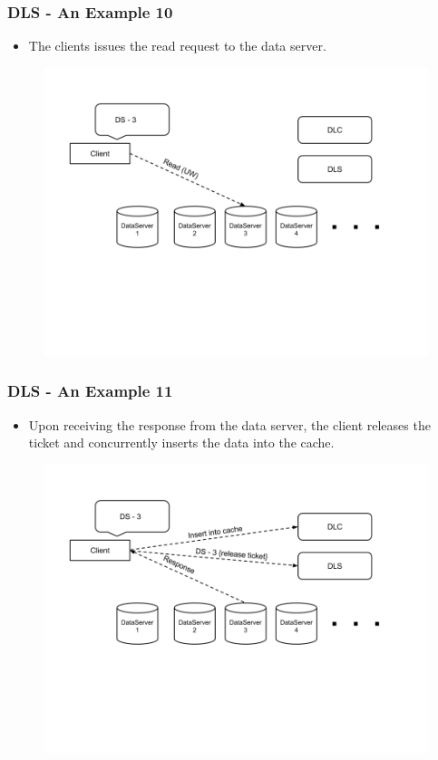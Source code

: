 \documentclass{beamer}
\begin{document}
\begin{frame}
  \frametitle{DLS - An Example 10}
  \begin{itemize}
  \item The clients issues the read request to the data server.
  \end{itemize}
  \begin{figure}
    \begin{center}
      \centerline{\includegraphics[scale=0.35]{img/DLS_Example11.png}}
    \end{center}
  \end{figure}
\end{frame}

\begin{frame}
  \frametitle{DLS - An Example 11}
  \begin{itemize}
  \item Upon receiving the response from the data server, the client releases
    the ticket and concurrently inserts the data into the cache.
  \end{itemize}
  \begin{figure}
    \begin{center}
      \centerline{\includegraphics[scale=0.35]{img/DLS_Example12.png}}
    \end{center}
  \end{figure}
\end{frame}
\end{document}
